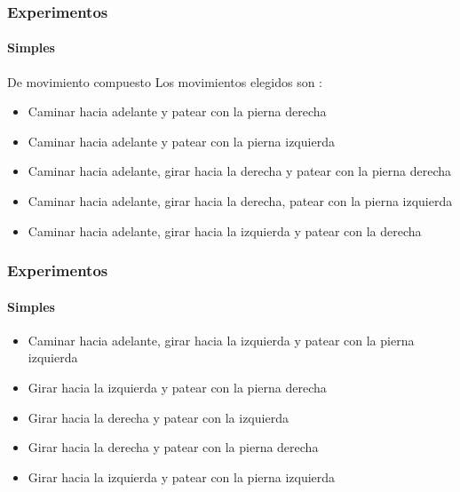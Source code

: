 \documentclass{beamer}
\begin{document}
\begin{frame}
\frametitle{Experimentos}
\framesubtitle{Simples}
\begin{block} {De movimiento compuesto}
Los movimientos elegidos son :
\end{block}

\begin{itemize}

\item Caminar hacia adelante y patear con la pierna derecha 
\item Caminar hacia adelante y patear con la pierna izquierda
\item Caminar hacia adelante, girar hacia la derecha y patear con la pierna derecha
\item Caminar hacia adelante, girar hacia la derecha, patear con la pierna izquierda 
\item Caminar hacia adelante, girar hacia la izquierda y patear con la derecha

\end{itemize}


\end{frame}
\begin{frame}
\frametitle{Experimentos}
\framesubtitle{Simples}

\begin{itemize}


\item Caminar hacia adelante, girar hacia la  izquierda y  patear con la pierna izquierda
\item Girar hacia la izquierda y patear con la pierna derecha
\item Girar hacia la derecha y patear con la izquierda
\item Girar hacia la derecha y patear con la pierna derecha
\item Girar hacia la izquierda y patear con la pierna izquierda


\end{itemize}

\end{frame}
\end{document}
